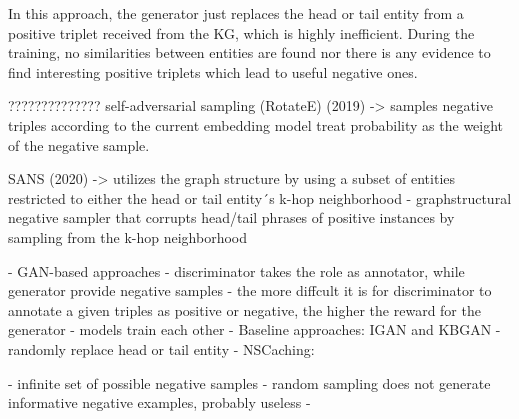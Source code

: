     
    
In this approach, the generator just replaces the head or tail entity from a positive triplet received from the \ac{KG}, which is highly inefficient.
    During the training, no similarities between entities are found nor there is any evidence to find interesting positive triplets which lead to useful negative ones.
    
??????????????
    self-adversarial sampling (RotateE) (2019)
        -> samples negative triples according to the current embedding model
        treat probability as the weight of the negative sample.

    SANS (2020)
        -> utilizes the graph structure by using a subset of entities restricted to either the head or tail entity´s k-hop neighborhood
        - graphstructural negative sampler that corrupts
        head/tail phrases of positive instances by sampling
        from the k-hop neighborhood




- GAN-based approaches
- discriminator takes the role as annotator, while generator provide negative samples
- the more diffcult it is for discriminator to annotate a given triples as positive or negative, the higher the reward for the generator
- models train each other
- Baseline approaches: IGAN and KBGAN
- randomly replace head or tail entity
- NSCaching: 

- infinite set of possible negative samples
- random sampling does not generate informative negative examples, probably useless
- 